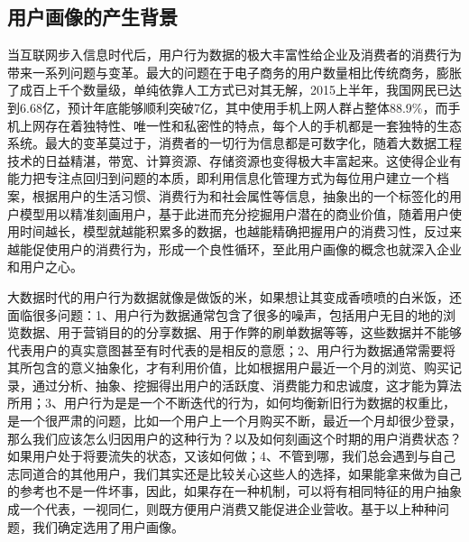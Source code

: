 	\subsection{用户画像的产生背景}
	当互联网步入信息时代后，用户行为数据的极大丰富性给企业及消费者的消费行为带来一系列问题与变革。最大的问题在于电子商务的用户数量相比传统商务，膨胀了成百上千个数量级，单纯依靠人工方式已对其无解，2015上半年，我国网民已达到6.68亿，预计年底能够顺利突破7亿，其中使用手机上网人群占整体88.9\%，而手机上网存在着独特性、唯一性和私密性的特点，每个人的手机都是一套独特的生态系统。最大的变革莫过于，消费者的一切行为信息都是可数字化，随着大数据工程技术的日益精湛，带宽、计算资源、存储资源也变得极大丰富起来。这使得企业有能力把专注点回归到问题的本质，即利用信息化管理方式为每位用户建立一个档案，根据用户的生活习惯、消费行为和社会属性等信息，抽象出的一个标签化的用户模型用以精准刻画用户，基于此进而充分挖掘用户潜在的商业价值，随着用户使用时间越长，模型就越能积累多的数据，也越能精确把握用户的消费习性，反过来越能促使用户的消费行为，形成一个良性循环，至此用户画像的概念也就深入企业和用户之心。

	大数据时代的用户行为数据就像是做饭的米，如果想让其变成香喷喷的白米饭，还面临很多问题：1、用户行为数据通常包含了很多的噪声，包括用户无目的地的浏览数据、用于营销目的的分享数据、用于作弊的刷单数据等等，这些数据并不能够代表用户的真实意图甚至有时代表的是相反的意愿；2、用户行为数据通常需要将其所包含的意义抽象化，才有利用价值，比如根据用户最近一个月的浏览、购买记录，通过分析、抽象、挖掘得出用户的活跃度、消费能力和忠诚度，这才能为算法所用；3、用户行为是是一个不断迭代的行为，如何均衡新旧行为数据的权重比，是一个很严肃的问题，比如一个用户上一个月购买不断，最近一个月却很少登录，那么我们应该怎么归因用户的这种行为？以及如何刻画这个时期的用户消费状态？如果用户处于将要流失的状态，又该如何做；4、不管到哪，我们总会遇到与自己志同道合的其他用户，我们其实还是比较关心这些人的选择，如果能拿来做为自己的参考也不是一件坏事，因此，如果存在一种机制，可以将有相同特征的用户抽象成一个代表，一视同仁，则既方便用户消费又能促进企业营收。基于以上种种问题，我们确定选用了用户画像。
